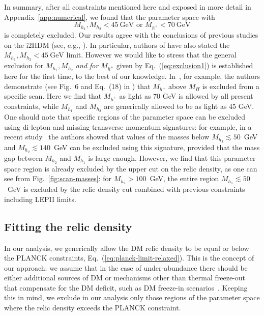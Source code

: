 \documentclass[12pt,a4paper]{article}
\begin{document}
In summary, after all constraints mentioned here and exposed in more detail in Appendix~\ref{app:numerical},
we found that the parameter space with  
\begin{equation}
M_{h_1},M_{h_2}<45~\mbox{GeV} 
\mbox{\ or\ } M_{h^+}<70~\mbox{GeV} 
\label{eq:exclusion1}
\end{equation}
is completely excluded. Our results  
agree with the conclusions of previous studies on the i2HDM (see, e.g., \cite{Arhrib:2013ela,Ilnicka:2015jba}).
In particular, authors of \cite{Ilnicka:2015jba} have also stated 
the $M_{h_1},M_{h_2}<45~\mbox{GeV}$ limit.
However we would like to stress that the general exclusion 
for $M_{h_1},M_{h_2}$ {\it and for} $M_{h^+}$
given by Eq.~(\ref{eq:exclusion1}) is established here for the first time, to the best of our knowledge. In~\cite{Ilnicka:2015jba}, for example,  the authors demonstrate 
(see Fig.~6 and Eq.~(18) in \cite{Ilnicka:2015jba}) that 
$M_{h^+}$ above $M_H$ is excluded from a  specific scan. Here we find that
$M_{h^+}$ as light as 70 GeV  is allowed by all present constraints, while $M_{h_1}$ and
$M_{h_2}$ are generically allowed to be as light as 45 GeV. One should note that specific regions of the
parameter space can be excluded using di-lepton and missing transverse momentum
signatures: for example, in a recent study~\cite{Belanger:2015kga} the authors showed that values of the masses below
$M_{h_1}\lesssim 50$~GeV and  $M_{h_2}\lesssim 140$~GeV can be excluded using this signature,
provided that the mass gap between $M_{h_2}$ and $M_{h_1}$ is large enough. However, we find that this parameter
space region is already excluded by the upper cut on the relic density, as one can see
from Fig.~\ref{fig:scan-masses}: for  $M_{h_2}>100$~GeV, the entire region $M_{h_1}\lesssim
50$~GeV  is excluded by the relic density cut combined with previous constraints including LEPII limits.

\subsection{Fitting the relic density}

In our analysis, we generically allow the DM relic density to be equal or
below the PLANCK constraints, Eq.~(\ref{eq:planck-limit-relaxed}).
This is the concept of our approach: we assume that in the case of under-abundance
there should be either additional sources of DM or mechanisms other than thermal freeze-out that 
compensate for the DM deficit, such as DM freeze-in scenarios~\cite{Hall:2009bx}.
Keeping this in mind, we exclude in our analysis only those regions of the parameter space 
where the relic density exceeds the PLANCK constraint.
\end{document}
